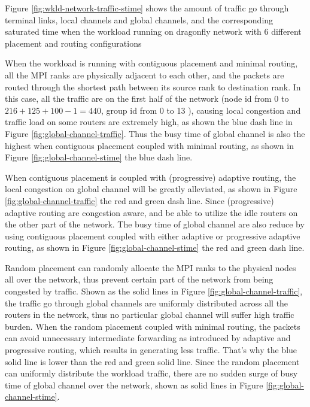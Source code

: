\documentclass[conference,compsoc]{IEEEtran}
\begin{document}
Figure \ref{fig:wkld-network-traffic-stime} shows the amount of traffic go through terminal links, local channels and global channels, and the corresponding saturated time when the workload running on dragonfly network with 6 different placement and routing configurations 


When the workload is running with contiguous placement and minimal routing, all the MPI ranks are physically adjacent to each other, and the packets are routed through the shortest path between its source rank to destination rank. In this case, all the traffic are on the first half of the network (node id from 0 to $216+125+100-1=440$, group id from 0 to 13 ), causing local congestion and traffic load on some routers are extremely high, as shown the blue dash line in Figure \ref{fig:global-channel-traffic}. Thus the busy time of global channel is also the highest when contiguous placement coupled with minimal routing, as shown in Figure \ref{fig:global-channel-stime} the blue dash line. 

When contiguous placement is coupled with (progressive) adaptive routing, the local congestion on global channel will be greatly alleviated, as shown in Figure \ref{fig:global-channel-traffic} the red and green dash line. Since (progressive) adaptive routing are congestion aware, and be able to utilize the idle routers on the other part of the network. The busy time of global channel are also reduce by using contiguous placement coupled with either adaptive or progressive adaptive routing, as shown in Figure \ref{fig:global-channel-stime} the red and green dash line. 

Random placement can randomly allocate the MPI ranks to the physical nodes all over the network, thus prevent certain part of the network from being congested by traffic. Shown as the solid lines in Figure \ref{fig:global-channel-traffic}, the traffic go through global channels are uniformly distributed across all the routers in the network, thus no particular global channel will suffer high traffic burden. When the random placement coupled with minimal routing, the packets can avoid unnecessary intermediate forwarding as introduced by adaptive and progressive routing, which results in generating less traffic. That's why the blue solid line is lower than the red and green solid line. Since the random placement can uniformly distribute the workload traffic, there are no sudden surge of busy time of global channel over the network, shown as solid lines in Figure \ref{fig:global-channel-stime}.
\end{document}
